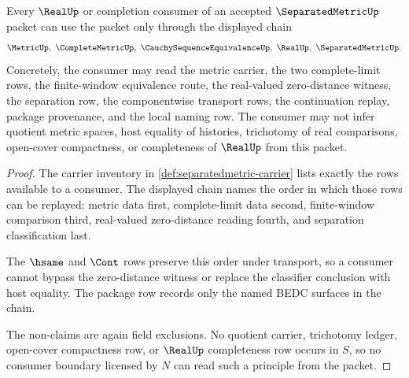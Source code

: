 \begin{theorem}\label{thm:separatedmetric-real-completion-consumer-boundary}
Every $\RealUp$ or completion consumer of an accepted $\SeparatedMetricUp$ packet can use the packet only through the displayed chain
$$
\MetricUp,\ \CompleteMetricUp,\ \CauchySequenceEquivalenceUp,\ \RealUp,\ \SeparatedMetricUp .
$$
Concretely, the consumer may read the metric carrier, the two complete-limit rows, the finite-window equivalence route, the real-valued zero-distance witness, the separation row, the componentwise transport rows, the continuation replay, package provenance, and the local naming row. The consumer may not infer quotient metric spaces, host equality of histories, trichotomy of real comparisons, open-cover compactness, or completeness of $\RealUp$ from this packet.
\end{theorem}
\begin{proof}
The carrier inventory in \autoref{def:separatedmetric-carrier} lists exactly the rows available to a consumer. The displayed chain names the order in which those rows can be replayed: metric data first, complete-limit data second, finite-window comparison third, real-valued zero-distance reading fourth, and separation classification last.

The $\hsame$ and $\Cont$ rows preserve this order under transport, so a consumer cannot bypass the zero-distance witness or replace the classifier conclusion with host equality. The package row records only the named BEDC surfaces in the chain.

The non-claims are again field exclusions. No quotient carrier, trichotomy ledger, open-cover compactness row, or $\RealUp$ completeness row occurs in $S$, so no consumer boundary licensed by $N$ can read such a principle from the packet.
\end{proof}

